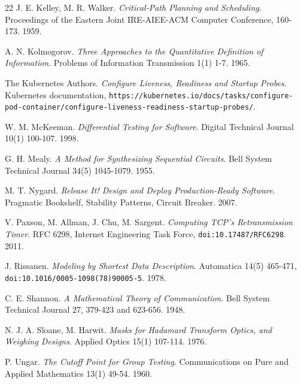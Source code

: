 \begin{thebibliography}{22}
J. E. Kelley, M. R. Walker. \emph{Critical-Path Planning and Scheduling}. Proceedings of the Eastern Joint IRE-AIEE-ACM Computer Conference, 160-173. 1959.

A. N. Kolmogorov. \emph{Three Approaches to the Quantitative Definition of Information}. Problems of Information Transmission 1(1) 1-7. 1965.

The Kubernetes Authors. \emph{Configure Liveness, Readiness and Startup Probes}. Kubernetes documentation, \texttt{https:/\allowbreak{}/\allowbreak{}kubernetes.io/\allowbreak{}docs/\allowbreak{}tasks/\allowbreak{}configure-pod-container/\allowbreak{}configure-liveness-readiness-startup-probes/}.

W. M. McKeeman. \emph{Differential Testing for Software}. Digital Technical Journal 10(1) 100-107. 1998.

G. H. Mealy. \emph{A Method for Synthesizing Sequential Circuits}. Bell System Technical Journal 34(5) 1045-1079. 1955.

M. T. Nygard. \emph{Release It! Design and Deploy Production-Ready Software}. Pragmatic Bookshelf, Stability Patterns, Circuit Breaker. 2007.

V. Paxson, M. Allman, J. Chu, M. Sargent. \emph{Computing TCP's Retransmission Timer}. RFC 6298, Internet Engineering Task Force, \texttt{doi:10.17487/\allowbreak{}RFC6298}. 2011.

J. Rissanen. \emph{Modeling by Shortest Data Description}. Automatica 14(5) 465-471, \texttt{doi:10.1016/\allowbreak{}0005-1098(78)90005-5}. 1978.

C. E. Shannon. \emph{A Mathematical Theory of Communication}. Bell System Technical Journal 27, 379-423 and 623-656. 1948.

N. J. A. Sloane, M. Harwit. \emph{Masks for Hadamard Transform Optics, and Weighing Designs}. Applied Optics 15(1) 107-114. 1976.

P. Ungar. \emph{The Cutoff Point for Group Testing}. Communications on Pure and Applied Mathematics 13(1) 49-54. 1960.

\end{thebibliography}

